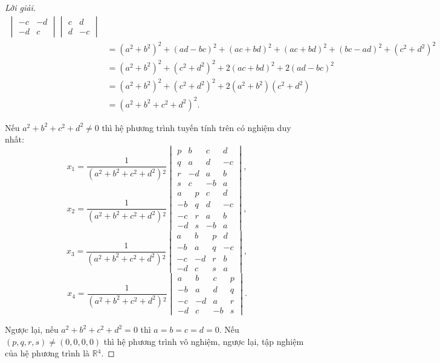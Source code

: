 \documentclass[class=linear-algebra,crop=false]{standalone}
\begin{document}
\begin{proof}[Lời giải]
\begin{align*}
		\begin{vmatrix}
			-c & -d \\
			-d & c
		\end{vmatrix}
		\begin{vmatrix}
			c & d  \\
			d & -c
		\end{vmatrix}                                                                                                 \\
		 & = {(a^{2}+b^{2})}^{2} + {(ad-bc)}^{2} + {(ac+bd)}^{2} + {(ac+bd)}^{2} + {(bc-ad)}^{2} + {(c^{2}+d^{2})}^{2} \\
		 & = {(a^{2}+b^{2})}^{2} + {(c^{2}+d^{2})}^{2} + 2{(ac+bd)}^{2} + 2{(ad-bc)}^{2}                               \\
		 & = {(a^{2}+b^{2})}^{2} + {(c^{2}+d^{2})}^{2} + 2(a^{2}+b^{2})(c^{2}+d^{2})                                   \\
		 & = {(a^{2}+b^{2}+c^{2}+d^{2})}^{2}.
	\end{align*}
	\endgroup{}
	\par Nếu $a^{2} + b^{2} + c^{2} + d^{2} \ne 0$ thì hệ phương trình tuyến tính trên có nghiệm duy nhất:
	\[
		x_{1} = \dfrac{1}{(a^{2} + b^{2} + c^{2} + d^{2}){}^{2}}
		\begin{vmatrix}
			p & b  & c  & d  \\
			q & a  & d  & -c \\
			r & -d & a  & b  \\
			s & c  & -b & a
		\end{vmatrix},
	\]
	\[
		x_{2} = \dfrac{1}{(a^{2} + b^{2} + c^{2} + d^{2}){}^{2}}
		\begin{vmatrix}
			a  & p & c  & d  \\
			-b & q & d  & -c \\
			-c & r & a  & b  \\
			-d & s & -b & a
		\end{vmatrix},
	\]
	\[
		x_{3} = \dfrac{1}{(a^{2} + b^{2} + c^{2} + d^{2}){}^{2}}
		\begin{vmatrix}
			a  & b  & p & d  \\
			-b & a  & q & -c \\
			-c & -d & r & b  \\
			-d & c  & s & a
		\end{vmatrix},
	\]
	\[
		x_{4} = \dfrac{1}{(a^{2} + b^{2} + c^{2} + d^{2}){}^{2}}
		\begin{vmatrix}
			a  & b  & c  & p \\
			-b & a  & d  & q \\
			-c & -d & a  & r \\
			-d & c  & -b & s
		\end{vmatrix}.
	\]
	\par Ngược lại, nếu $a^{2} + b^{2} + c^{2} + d^{2} = 0$ thì $a = b = c = d = 0$. Nếu $(p, q, r, s) \ne (0, 0, 0, 0)$ thì hệ phương trình vô nghiệm, ngược lại, tập nghiệm của hệ phương trình là $\mathbb{R}{}^{4}$.
\end{proof}
\end{document}
